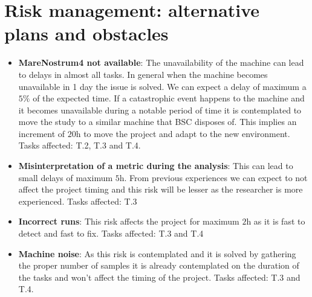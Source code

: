 \section{Risk management: alternative plans and obstacles}

\begin{itemize}
  \item \textbf{MareNostrum4 not available}: The unavailability of the machine can lead to delays in almost all tasks. In general when the machine becomes unavailable in 1 day the issue is solved. We can expect a delay of maximum a $5\%$ of the expected time. If a catastrophic event happens to the machine and it becomes unavailable during a notable period of time it is contemplated to move the study to a similar machine that BSC disposes of. This implies an increment of $\si{20\hour}$ to move the project and adapt to the new environment. Tasks affected: T.2, T.3 and T.4.

  \item \textbf{Misinterpretation of a metric during the analysis}: This can lead to small delays of maximum $\si{5\hour}$. From previous experiences we can expect to not affect the project timing and this risk will be lesser as the researcher is more experienced. Tasks affected: T.3

  \item \textbf{Incorrect runs}: This risk affects the project for maximum $\si{2\hour}$ as it is fast to detect and fast to fix. Tasks affected: T.3 and T.4

  \item \textbf{Machine noise}: As this risk is contemplated and it is solved by gathering the proper number of samples it is already contemplated on the duration of the tasks and won't affect the timing of the project. Tasks affected: T.3 and T.4. 
\end{itemize}

